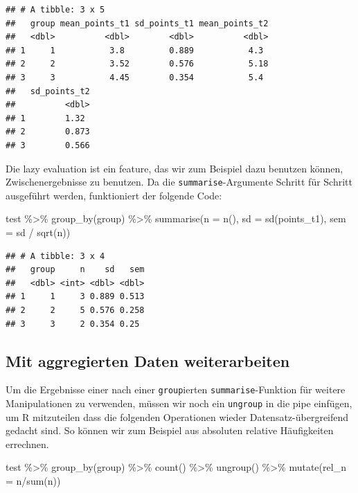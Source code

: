 \documentclass[
]{book}
\newenvironment{Shaded}{\begin{snugshade}}{\end{snugshade}}
\newcommand{\AttributeTok}[1]{\textcolor[rgb]{0.77,0.63,0.00}{#1}}
\newcommand{\FunctionTok}[1]{\textcolor[rgb]{0.00,0.00,0.00}{#1}}
\newcommand{\NormalTok}[1]{#1}
\newcommand{\SpecialCharTok}[1]{\textcolor[rgb]{0.00,0.00,0.00}{#1}}
\begin{document}
\begin{verbatim}
## # A tibble: 3 x 5
##   group mean_points_t1 sd_points_t1 mean_points_t2
##   <dbl>          <dbl>        <dbl>          <dbl>
## 1     1           3.8         0.889           4.3 
## 2     2           3.52        0.576           5.18
## 3     3           4.45        0.354           5.4 
##   sd_points_t2
##          <dbl>
## 1        1.32 
## 2        0.873
## 3        0.566
\end{verbatim}

Die lazy evaluation ist ein feature, das wir zum Beispiel dazu benutzen können, Zwischenergebnisse zu benutzen.
Da die \texttt{summarise}-Argumente Schritt für Schritt ausgeführt werden, funktioniert der folgende Code:

\begin{Shaded}
\begin{Highlighting}[]
\NormalTok{test }\SpecialCharTok{\%\textgreater{}\%} 
  \FunctionTok{group\_by}\NormalTok{(group) }\SpecialCharTok{\%\textgreater{}\%} 
  \FunctionTok{summarise}\NormalTok{(}\AttributeTok{n =} \FunctionTok{n}\NormalTok{(),}
            \AttributeTok{sd =} \FunctionTok{sd}\NormalTok{(points\_t1),}
            \AttributeTok{sem =}\NormalTok{ sd }\SpecialCharTok{/} \FunctionTok{sqrt}\NormalTok{(n))}
\end{Highlighting}
\end{Shaded}

\begin{verbatim}
## # A tibble: 3 x 4
##   group     n    sd   sem
##   <dbl> <int> <dbl> <dbl>
## 1     1     3 0.889 0.513
## 2     2     5 0.576 0.258
## 3     3     2 0.354 0.25
\end{verbatim}

\hypertarget{mit-aggregierten-daten-weiterarbeiten}{%
\subsection{Mit aggregierten Daten weiterarbeiten}\label{mit-aggregierten-daten-weiterarbeiten}}

Um die Ergebnisse einer nach einer \texttt{group}ierten \texttt{summarise}-Funktion für weitere Manipulationen zu verwenden, müssen wir noch ein \texttt{ungroup} in die pipe einfügen, um R mitzuteilen dass die folgenden Operationen wieder Datensatz-übergreifend gedacht sind. So können wir zum Beispiel aus absoluten relative Häufigkeiten errechnen.

\begin{Shaded}
\begin{Highlighting}[]
\NormalTok{test }\SpecialCharTok{\%\textgreater{}\%} 
  \FunctionTok{group\_by}\NormalTok{(group) }\SpecialCharTok{\%\textgreater{}\%}
  \FunctionTok{count}\NormalTok{() }\SpecialCharTok{\%\textgreater{}\%} 
  \FunctionTok{ungroup}\NormalTok{() }\SpecialCharTok{\%\textgreater{}\%} 
  \FunctionTok{mutate}\NormalTok{(}\AttributeTok{rel\_n =}\NormalTok{ n}\SpecialCharTok{/}\FunctionTok{sum}\NormalTok{(n))}
\end{Highlighting}
\end{Shaded}
\end{document}
